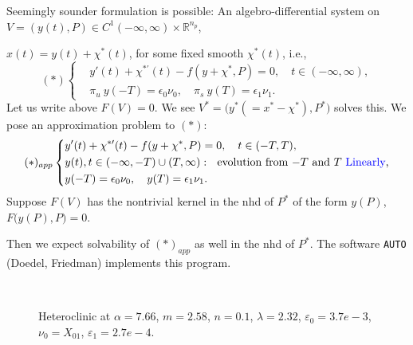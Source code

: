 \documentclass{beamer}
\def\blue{\color{blue}}
\def\eps{\varepsilon}
\begin{document}
\begin{frame}
 {\scriptsize
 Seemingly sounder formulation is possible: An algebro-differential system on $V= (y(t),P) \in C^1(-\infty,\infty) \times \mathbb{R}^{n_p}$, 
 
 $x(t) = y(t) +\chi^*(t)$, for some fixed smooth $\chi^*(t)$, i.e., %
 \begin{equation*}(*)\left\{
 \begin{aligned}
  &y'(t) +\chi^{*\prime}(t) - f(y+\chi^*,P) =0, \quad t\in (-\infty,\infty),\\
  &\pi_u~y(-T) = \epsilon_0\nu_0, \quad \pi_s~y(T) = \epsilon_1\nu_1.
 \end{aligned}\right.
 \end{equation*}
 Let us write above $F(V) = 0$. We see $V^*=\big(y^* (= x^*-\chi^*),P^*)$ solves this. 
 \pause
 We pose an approximation problem to $(*)$:
 \begin{equation*}(*)_{app}\left\{
 \begin{aligned}
  &y'(t) +\chi^{*\prime}(t) - f(y+\chi^*,P) =0, \quad t\in (-T,T),\\
  &y(t), t\in (-\infty,-T)\cup (T,\infty): ~~ \text{evolution from $-T$ and $T$ {\blue Linearly},}\\
  &y(-T) = \epsilon_0\nu_0, \quad y(T) = \epsilon_1\nu_1.
 \end{aligned}\right.
 \end{equation*}
 Suppose $F(V)$ has the nontrivial kernel in the nhd of $P^*$ of the form $y(P)$, $F\big(y(P),P\big)=0$.
 
 Then we expect solvability of $(*)_{app}$ as well in the nhd of $P^*$. The software \texttt{AUTO} (Doedel, Friedman) implements this program.
 } 
\end{frame}

\begin{frame}
  \begin{figure}
  \centering
  \setcounter{subfigure}{0}
  \quad
  \\
  \caption{\scriptsize Heteroclinic at $\alpha = 7.66$, $m=2.58$, $n=0.1$, $\lambda=2.32$, $\eps_0=3.7e-3$, $\nu_0=X_{01}$, $\eps_1=2.7e-4$.}
 \end{figure}

\end{frame}
\end{document}
